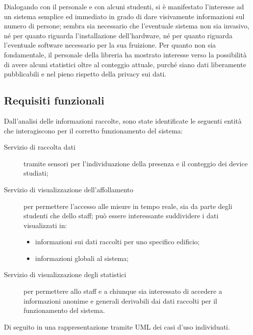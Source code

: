 Dialogando con il personale e con alcuni studenti, si è manifestato l'interesse ad un sistema semplice ed immediato in grado di dare visivamente informazioni sul numero di persone;
sembra sia necessario che l'eventuale sistema non sia invasivo, né per quanto riguarda l'installazione dell'hardware, né per quanto riguarda l'eventuale software necessario per la sua fruizione.
Per quanto non sia fondamentale, il personale della libreria ha mostrato interesse verso la possibilità di avere alcuni statistici oltre al conteggio attuale, purché siano dati liberamente pubblicabili e nel pieno rispetto della privacy sui dati.

\subsection{Requisiti funzionali}\label{subsec:req:func}

Dall'analisi delle informazioni raccolte, sono state identificate le seguenti entità che interagiscono per il corretto funzionamento del sistema:

\begin{description}
    \item[Servizio di raccolta dati]
      tramite sensori per l'individuazione della presenza e il conteggio dei device studiati;
    \item[Servizio di visualizzazione dell'affollamento]
      per permettere l'accesso alle misure in tempo reale, sia da parte degli studenti che dello staff;
      può essere interessante suddividere i dati visualizzati in:
      \begin{itemize}
        \item informazioni sui dati raccolti per uno specifico edificio;
        \item informazioni globali al sistema;
      \end{itemize}
    \item[Servizio di visualizzazione degli statistici]
      per permettere allo staff e a chiunque sia interessato di accedere a informazioni anonime e generali
      derivabili dai dati raccolti per il funzionamento del sistema.
\end{description}

Di seguito in  una rappresentazione tramite UML dei casi d'uso individuati.

